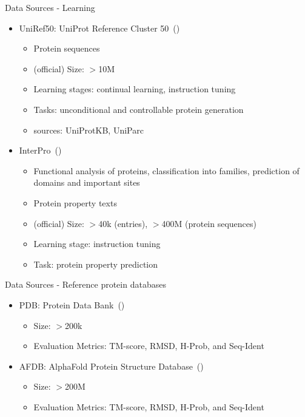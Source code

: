 \begin{frame}{Data Sources - Learning}
	\begin{itemize}\setlength\itemsep{3em}
		\item UniRef50: UniProt Reference Cluster 50~(\cite{suzek2015uniref})
		\begin{itemize}
			\item Protein sequences
			\item (official) Size: $>$10M
			\item Learning stages: continual learning, instruction tuning
			\item Tasks: unconditional and controllable protein generation
			\item sources: UniProtKB, UniParc
		\end{itemize}
		\item InterPro~(\cite{paysan2023interpro})
		\begin{itemize}
			\item Functional analysis of proteins, classification into families, prediction of domains and important sites
			\item Protein property texts
			\item (official) Size: $>$40k (entries), $>$400M (protein sequences)
			\item Learning stage: instruction tuning
			\item Task: protein property prediction
		\end{itemize}
	\end{itemize}
\end{frame}

\begin{frame}{Data Sources - Reference protein databases}
	\begin{itemize}\setlength\itemsep{3em}
		\item PDB: Protein Data Bank~(\cite{berman2002protein})
		\begin{itemize}
			\item Size: $>$200k
			\item Evaluation Metrics: TM-score, RMSD, H-Prob, and Seq-Ident
		\end{itemize}
		\item AFDB: AlphaFold Protein Structure Database~(\cite{varadi2022alphafold})
		\begin{itemize}
			\item Size: $>$200M
			\item Evaluation Metrics: TM-score, RMSD, H-Prob, and Seq-Ident
		\end{itemize}
	\end{itemize}
\end{frame}